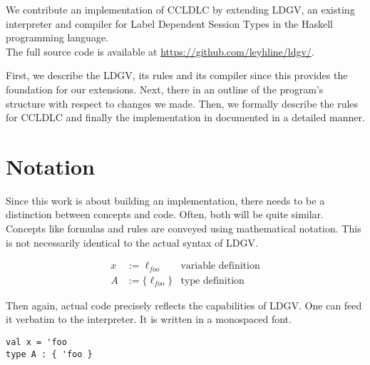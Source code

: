We contribute an implementation of CCLDLC by extending LDGV, an existing interpreter and compiler for Label Dependent Session Types in the Haskell programming language.
\\
The full source code is available at \url{https://github.com/leyhline/ldgv/}.

First, we describe the LDGV, its rules and its compiler since this provides the foundation for our extensions. Next, there in an outline of the program's structure with respect to changes we made. Then, we formally describe the rules for CCLDLC and finally the implementation in documented in a detailed manner.

\section{Notation}

Since this work is about building an implementation, there needs to be a distinction between concepts and code. Often, both will be quite similar. Concepts like formulas and rules are conveyed using mathematical notation. This is not necessarily identical to the actual syntax of LDGV.

\begin{align*}
 x &:= \ell_{foo} & \text{variable definition} \\
 A &:= \{ \ell_{foo} \} & \text{type definition}
\end{align*}

Then again, actual code precisely reflects the capabilities of LDGV. One can feed it verbatim to the interpreter. It is written in a monospaced font.

\begin{lstlisting}[language=ldgv,caption=Code listing example]
val x = 'foo
type A : { 'foo }
\end{lstlisting}
